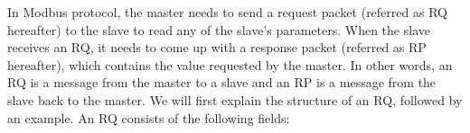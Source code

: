 

In Modbus protocol, the master needs to send a request packet (referred as RQ hereafter) 
to the slave to read any of the slave's parameters. When the 
slave receives an RQ, it needs to come up with a response packet 
(referred as RP hereafter), which contains the value requested 
by the master. In other words, an RQ is a message from the 
master to a slave and an RP is a message from the slave back to the 
master. We will first explain the structure of an RQ, followed by an example. 
An RQ consists of the following fields:
